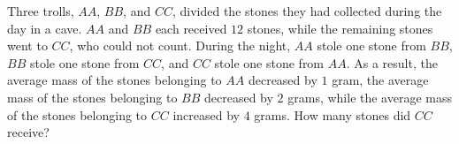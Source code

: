 Three trolls, $AA$, $BB$, and $CC$, divided the stones they had collected during the day in a cave. $AA$ and $BB$ each received $12$ stones, while the remaining stones went to $CC$, who could not count. During the night, $AA$ stole one stone from $BB$, $BB$ stole one stone from $CC$, and $CC$ stole one stone from $AA$.  As a result, the average mass of the stones belonging to $AA$ decreased by $1$ gram, the average mass of the stones belonging to $BB$ decreased by $2$ grams, while the average mass of the stones belonging to $CC$ increased by $4$ grams. How many stones did $CC$ receive?
